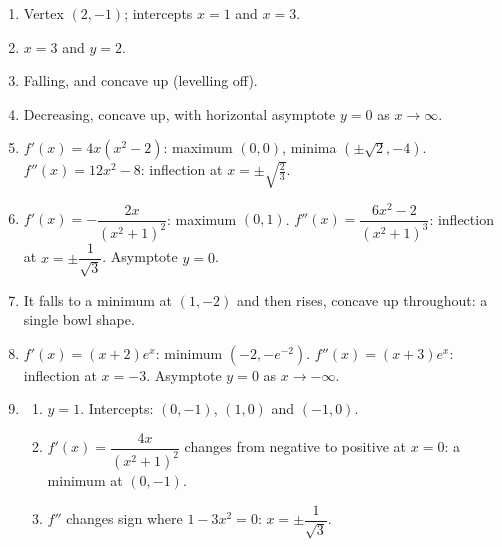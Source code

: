 \documentclass[11pt]{article}
\begin{document}
\newpage
\begin{solbox}
\begin{enumerate}[leftmargin=*,itemsep=4pt]
  \item Vertex $(2,-1)$; intercepts $x=1$ and $x=3$.
  \item $x=3$ and $y=2$.
  \item Falling, and concave up (levelling off).
  \item Decreasing, concave up, with horizontal asymptote $y=0$ as $x\to\infty$.
  \item $f'(x)=4x\left(x^2-2\right)$: maximum $(0,0)$, minima $\left(\pm\sqrt2,-4\right)$. $f''(x)=12x^2-8$: inflection at $x=\pm\sqrt{\tfrac23}$.
  \item $f'(x)=-\dfrac{2x}{(x^2+1)^2}$: maximum $(0,1)$. $f''(x)=\dfrac{6x^2-2}{(x^2+1)^3}$: inflection at $x=\pm\dfrac{1}{\sqrt3}$. Asymptote $y=0$.
  \item It falls to a minimum at $(1,-2)$ and then rises, concave up throughout: a single bowl shape.
  \item $f'(x)=(x+2)e^{x}$: minimum $\left(-2,-e^{-2}\right)$. $f''(x)=(x+3)e^{x}$: inflection at $x=-3$. Asymptote $y=0$ as $x\to-\infty$.
  \item \begin{enumerate}[label=(\alph*),leftmargin=*,itemsep=3pt]
    \item $y=1$. Intercepts: $(0,-1)$, $(1,0)$ and $(-1,0)$.
    \item $f'(x)=\dfrac{4x}{(x^2+1)^2}$ changes from negative to positive at $x=0$: a minimum at $(0,-1)$.
    \item $f''$ changes sign where $1-3x^2=0$: $x=\pm\dfrac{1}{\sqrt3}$.
  \end{enumerate}
\end{enumerate}
\end{solbox}
\end{document}
